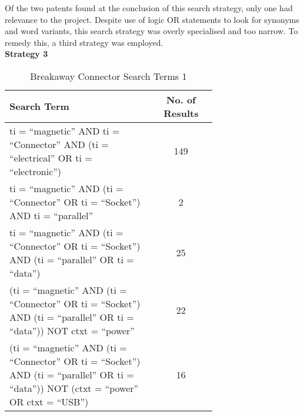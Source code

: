 \documentclass [12pt]{article}
\begin{document}
Of the two patents found at the conclusion of this search strategy, only one had relevance to the project.
Despite use of logic OR statements to look for synonyms and word variants, this search strategy was overly specialised and too narrow.
To remedy this, a third strategy was employed.\\

\textbf{Strategy 3}
\begin{table}[H]
    \centering
    \setlength{\arrayrulewidth}{1.5pt}
    \begin{tabular}{|p{0.7\linewidth}|c|}
    \hline
    \cellcolor{gray!40}Search Term & \cellcolor{gray!40}No. of Results \\
    \hline
    ti = “magnetic” AND ti = “Connector” AND (ti = “electrical” OR ti = “electronic”) & 149 \\
    \hline
    ti = “magnetic” AND (ti = “Connector” OR ti = “Socket”) AND ti = “parallel” & 2 \\
    \hline
    ti = “magnetic” AND (ti = “Connector” OR ti = “Socket”) AND (ti = “parallel” OR ti = “data”) & 25 \\
    \hline
    (ti = “magnetic” AND (ti = “Connector” OR ti = “Socket”) AND (ti = “parallel” OR ti = “data”)) NOT ctxt = “power” & 22 \\
    \hline
    (ti = “magnetic” AND (ti = “Connector” OR ti = “Socket”) AND (ti = “parallel” OR ti = “data”)) NOT (ctxt = “power” OR ctxt = “USB”) & 16\\
    \hline
    \end{tabular}
    \caption{Breakaway Connector Search Terms 1}
    \label{table:breakaway_connector_search_strat_3}
\end{table}
\end{document}
